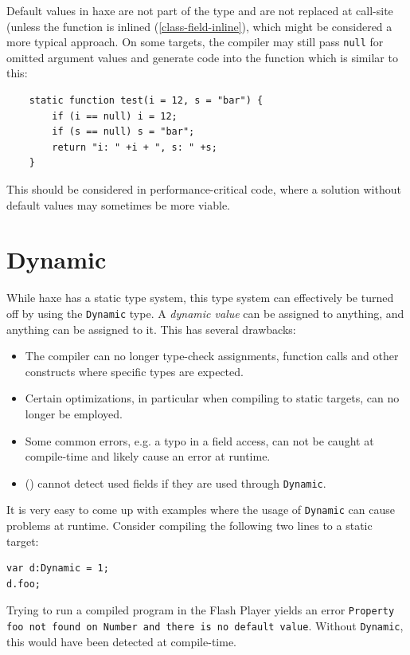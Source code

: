 \documentclass[a4paper,oneside]{book}
\newcommand{\type}[1]{\texttt{#1}}
\newcommand{\expr}[1]{\texttt{#1}}
\newcommand{\Fullref}[1]{\nameref{#1} (\Cref{#1})}
\newcommand{\tref}[2]{#1 (\ref{#2})}
\begin{document}
Default values in haxe are not part of the type and are not replaced at call-site (unless the function is \tref{inlined}{class-field-inline}, which might be considered a more typical approach. On some targets, the compiler may still pass \expr{null} for omitted argument values and generate code into the function which is similar to this:
\begin{lstlisting}
	static function test(i = 12, s = "bar") {
		if (i == null) i = 12;
		if (s == null) s = "bar";
		return "i: " +i + ", s: " +s;
	}
\end{lstlisting}
This should be considered in performance-critical code, where a solution without default values may sometimes be more viable.




\section{Dynamic}
\label{types-dynamic}

While haxe has a static type system, this type system can effectively be turned off by using the \type{Dynamic} type. A \emph{dynamic value} can be assigned to anything, and anything can be assigned to it. This has several drawbacks:

\begin{itemize}
	\item The compiler can no longer type-check assignments, function calls and other constructs where specific types are expected.
	\item Certain optimizations, in particular when compiling to static targets, can no longer be employed.
	\item Some common errors, e.g. a typo in a field access, can not be caught at compile-time and likely cause an error at runtime.
	\item \Fullref{cr-dce} cannot detect used fields if they are used through \type{Dynamic}.
\end{itemize}
It is very easy to come up with examples where the usage of \type{Dynamic} can cause problems at runtime. Consider compiling the following two lines to a static target:

\begin{lstlisting}
var d:Dynamic = 1;
d.foo;
\end{lstlisting}
Trying to run a compiled program in the Flash Player yields an error \texttt{Property foo not found on Number and there is no default value}. Without \type{Dynamic}, this would have been detected at compile-time.
\end{document}
